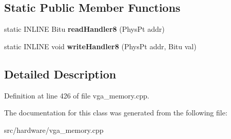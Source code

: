 \subsection*{Static Public Member Functions}
\begin{DoxyCompactItemize}
\item 
\hypertarget{classVGA__ET4000__ChainedVGA__Slow__Handler_aaaf88b1fe358e7af3b0411aa2a176fee}{static I\-N\-L\-I\-N\-E Bitu {\bfseries read\-Handler8} (Phys\-Pt addr)}\label{classVGA__ET4000__ChainedVGA__Slow__Handler_aaaf88b1fe358e7af3b0411aa2a176fee}

\item 
\hypertarget{classVGA__ET4000__ChainedVGA__Slow__Handler_ae2f914cb52258b4126058bfa4344198f}{static I\-N\-L\-I\-N\-E void {\bfseries write\-Handler8} (Phys\-Pt addr, Bitu val)}\label{classVGA__ET4000__ChainedVGA__Slow__Handler_ae2f914cb52258b4126058bfa4344198f}

\end{DoxyCompactItemize}


\subsection{Detailed Description}


Definition at line 426 of file vga\-\_\-memory.\-cpp.



The documentation for this class was generated from the following file\-:\begin{DoxyCompactItemize}
\item 
src/hardware/vga\-\_\-memory.\-cpp\end{DoxyCompactItemize}
